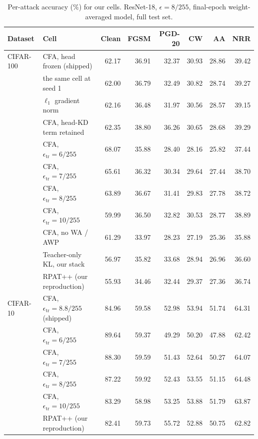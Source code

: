 \begin{table}[!htbp]
  \centering \small \setlength{\tabcolsep}{4.5pt}
  \caption{Per-attack accuracy (\%) for our cells. ResNet-18, $\epsilon = 8/255$, final-epoch
  weight-averaged model, full test set.}
  \label{tab:fullmetrics}
  \begin{tabular}{llrrrrrr}
    \toprule
    Dataset & Cell & Clean & FGSM & PGD-20 & CW & AA & NRR \\
    \midrule
    CIFAR-100 & CFA, head frozen (shipped)   & 62.17 & 36.91 & 32.37 & 30.93 & 28.86 & 39.42 \\
              & \quad the same cell at seed 1 & 62.00 & 36.79 & 32.49 & 30.82 & 28.74 & 39.27 \\
              & \quad $\ell_1$ gradient norm  & 62.16 & 36.48 & 31.97 & 30.56 & 28.57 & 39.15 \\
              & CFA, head-KD term retained   & 62.35 & 38.80 & 36.26 & 30.65 & 28.68 & 39.29 \\
              & CFA, $\epsilon_{\mathrm{tr}} = 6/255$ & 68.07 & 35.88 & 28.40 & 28.16 & 25.82 & 37.44 \\
              & CFA, $\epsilon_{\mathrm{tr}} = 7/255$ & 65.61 & 36.32 & 30.34 & 29.64 & 27.44 & 38.70 \\
              & CFA, $\epsilon_{\mathrm{tr}} = 8/255$ & 63.89 & 36.67 & 31.41 & 29.83 & 27.78 & 38.72 \\
              & CFA, $\epsilon_{\mathrm{tr}} = 10/255$& 59.99 & 36.50 & 32.82 & 30.53 & 28.77 & 38.89 \\
              & CFA, no WA / AWP             & 61.29 & 33.97 & 28.23 & 27.19 & 25.36 & 35.88 \\
              & Teacher-only KL, our stack   & 56.97 & 35.82 & 33.68 & 28.94 & 26.96 & 36.60 \\
              & RPAT++ (our reproduction)    & 55.93 & 34.46 & 32.44 & 29.37 & 27.36 & 36.74 \\
    \midrule
    CIFAR-10  & CFA, $\epsilon_{\mathrm{tr}} = 8.8/255$ (shipped) & 84.96 & 59.58 & 52.98 & 53.94 & 51.74 & 64.31 \\
              & CFA, $\epsilon_{\mathrm{tr}} = 6/255$  & 89.64 & 59.37 & 49.29 & 50.20 & 47.88 & 62.42 \\
              & CFA, $\epsilon_{\mathrm{tr}} = 7/255$  & 88.30 & 59.59 & 51.43 & 52.64 & 50.27 & 64.07 \\
              & CFA, $\epsilon_{\mathrm{tr}} = 8/255$  & 87.22 & 59.92 & 52.43 & 53.55 & 51.15 & 64.48 \\
              & CFA, $\epsilon_{\mathrm{tr}} = 10/255$ & 83.29 & 58.98 & 53.25 & 53.88 & 51.79 & 63.87 \\
              & RPAT++ (our reproduction)    & 82.41 & 59.73 & 55.72 & 52.88 & 50.75 & 62.82 \\
    \bottomrule
  \end{tabular}
\end{table}

